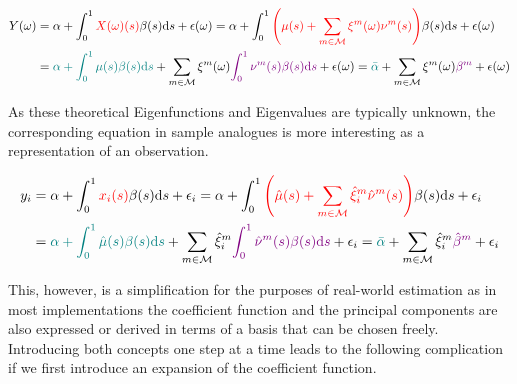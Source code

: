 \documentclass[11pt,twoside,a4paper]{article}
\begin{document}
	\begin{equation}
		\begin{split}
			Y(\omega) &= \alpha + \int_{0}^{1} {\color{red}X(\omega)(s)} \beta(s) \mathrm{d}s + \epsilon(\omega)
			= \alpha + \int_{0}^{1} {\color{red}\left(\mu(s) + \sum_{m \in \mathcal{M}} \xi^m(\omega) \nu^m(s)\right)} \beta(s) \mathrm{d}s + \epsilon(\omega)\\
			&= {\color{teal}\alpha + \int_{0}^{1} \mu(s) \beta(s) \mathrm{d}s} + \sum_{m \in \mathcal{M}} \xi^m(\omega) {\color{violet}\int_{0}^{1} \nu^m(s) \beta(s) \mathrm{d}s} + \epsilon(\omega)
			= {\color{teal}\bar{\alpha}} + \sum_{m \in \mathcal{M}} \xi^m(\omega) {\color{violet}\beta^m} + \epsilon(\omega)
		\end{split}
	\end{equation}

	As these theoretical Eigenfunctions and Eigenvalues are typically unknown, the corresponding equation in sample analogues is more interesting as a representation of an observation.
	
	\begin{equation}
		\begin{split}
			y_i &= \alpha + \int_{0}^{1} {\color{red}x_i(s)} \beta(s) \mathrm{d}s + \epsilon_i
			= \alpha + \int_{0}^{1} {\color{red}\left(\hat{\mu}(s) + \sum_{m \in \mathcal{M}} \hat{\xi}^m_i \hat{\nu}^m(s)\right)} \beta(s) \mathrm{d}s + \epsilon_i\\
			&= {\color{teal}\alpha + \int_{0}^{1} \hat{\mu}(s) \beta(s) \mathrm{d}s} + \sum_{m \in \mathcal{M}} \hat{\xi}^m_i {\color{violet}\int_{0}^{1} \hat{\nu}^m(s) \beta(s) \mathrm{d}s} + \epsilon_i
			= {\color{teal}\bar{\alpha}} + \sum_{m \in \mathcal{M}} \hat{\xi}^m_i {\color{violet}\hat{\beta}^m} + \epsilon_i
		\end{split}
	\end{equation}
	
	This, however, is a simplification for the purposes of real-world estimation as in most implementations the coefficient function and the principal components are also expressed or derived in terms of a basis that can be chosen freely. Introducing both concepts one step at a time leads to the following complication if we first introduce an expansion of the coefficient function.
\end{document}
